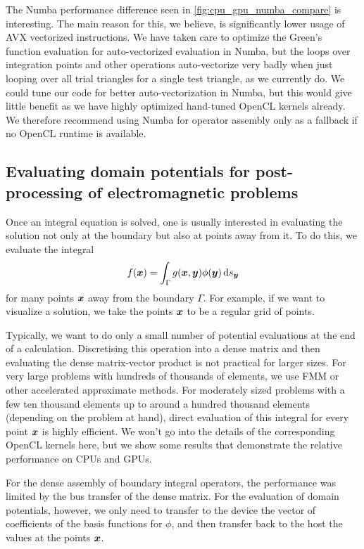 The Numba performance difference seen in \cref{fig:cpu_gpu_numba_compare} is interesting. The main reason for this, we believe, is significantly lower usage of AVX vectorized instructions. We have taken care to optimize the Green's function evaluation for auto-vectorized evaluation in Numba, but the loops over integration points and other operations auto-vectorize very badly when just looping over all trial triangles for a single test triangle, as we currently do. We could tune our code for better auto-vectorization in Numba, but this would give little benefit as we have highly optimized hand-tuned OpenCL kernels already. We therefore recommend using Numba for operator assembly only as a fallback if no OpenCL runtime is available.

\subsection{Evaluating domain potentials for post-processing of electromagnetic problems}
Once an integral equation is solved, one is usually interested in evaluating the solution not only at the boundary but also at points away from it. To do this, we evaluate the integral
$$
f(\bx) = \int_{\Gamma}g(\bx, \by)\phi(\by) \ds[\by]
$$
for many points $\boldsymbol{x}$ away from the boundary $\Gamma$. For example, if we want to visualize a solution, we take the points $\boldsymbol{x}$ to be a regular grid of points.

Typically, we want to do only a small number of potential evaluations at the end of a calculation. Discretising this operation into a dense matrix and then evaluating the dense matrix-vector product is not practical for larger sizes. For very large problems with hundreds of thousands of elements, we use FMM or other accelerated approximate methods. For moderately sized problems with a few ten thousand elements up to around a hundred thousand elements (depending on the problem at hand), direct evaluation of this integral for every point $\boldsymbol{x}$ is highly efficient. We won't go into the details of the corresponding OpenCL kernels here, but we show some results that demonstrate the relative performance on CPUs and GPUs.

For the dense assembly of boundary integral operators, the performance was limited by the bus transfer of the dense matrix. For the evaluation of domain potentials, however, we only need to transfer to the device the vector of coefficients of the basis functions for $\phi$, and then transfer back to the host the values at the points $\boldsymbol{x}$.

